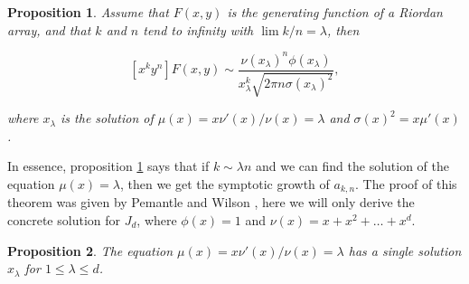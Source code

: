 \documentclass{article}
\newtheorem{proposition}{Proposition}
\begin{document}
\begin{proposition}
\label{th:PW}
Assume that $F(x,y)$ is the generating function of a Riordan array, and
that $k$ and $n$ tend to infinity with $\lim k/n = \lambda$, then

\begin{equation}
\label{eq:assRA}
[x^ky^n]F(x,y) \sim \frac{\nu(x_\lambda)^n\phi(x_\lambda)}
  {x_\lambda^k\sqrt{2\pi n \sigma(x_\lambda)^2}},
\end{equation}

\noindent
where $x_\lambda$ is the solution of
$\mu(x) = x\nu'(x)/\nu(x) = \lambda$ and $\sigma(x)^2 = x \mu'(x)$.
\end{proposition}

In essence, proposition \ref{th:PW} says that if $k \sim \lambda n$ and we
can find the solution of the equation $\mu(x) = \lambda$, then we get the
symptotic growth of $a_{k,n}$.  The proof of this theorem was given by
Pemantle and Wilson \cite{PemWil08,AnalComb2013}, here we will only derive
the concrete solution for $J_d$, where $\phi(x) = 1$ and $\nu(x) = x + x^2
+ \ldots +x^d$.

\begin{proposition}
\label{th:mu}
The equation $\mu(x) = x\nu'(x)/\nu(x) = \lambda$ has a single solution
$x_\lambda$ for $1 \leq \lambda \leq d$.
\end{proposition}
\end{document}
